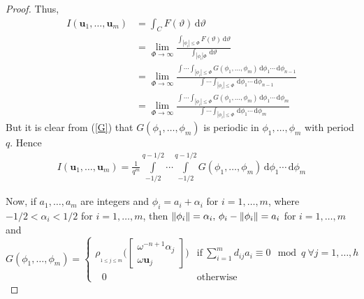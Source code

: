 \documentclass[11pt]{article}
\theoremstyle{definition}
\theoremstyle{proof}
\begin{document}
\begin{proof}
    Thus,
    \begin{align*}
        I(\bm{u}_1, \ldots, \bm{u}_m) &= \int_{C} F(\vartheta ) \, \mathrm{d} \vartheta \\
        &= \lim_{\Phi  \to \infty} \frac{\int_{|\phi _i| \leq \Phi } F(\vartheta ) \, \mathrm{d} \vartheta }{\int_{|\phi _i| \Phi } \, \mathrm{d} \vartheta } \\
        &= \lim_{\Phi  \to \infty} \frac{\int \cdots \int_{|\phi _i| \leq \Phi } G(\phi _1, \ldots, \phi _{m}) \, \mathrm{d} \phi _1 \cdots \, \mathrm{d} \phi _{n-1}}{\int \cdots \int_{|\phi _i| \leq \Phi } \, \mathrm{d} \phi _1 \cdots \, \mathrm{d} \phi _{n-1}} \\
        &= \lim_{\Phi  \to \infty} \frac{\int \cdots \int_{|\phi _i| \leq \Phi } G(\phi _1, \ldots, \phi _{m}) \, \mathrm{d} \phi _1 \cdots \, \mathrm{d} \phi _{m}}{\int \cdots \int_{|\phi _i| \leq \Phi } \, \mathrm{d} \phi _1 \cdots \, \mathrm{d} \phi _{m}}
    \end{align*}
    But it is clear from (\ref{G}) that $G(\phi _1, \ldots, \phi _{m})$ is periodic in $\phi _1, \ldots, \phi _{m}$ with period $q$.
    Hence
    \begin{align}\label{pI}
        I(\bm{u}_1, \ldots, \bm{u}_m) = \frac{1}{q^m} \int\limits_{-1/2}^{q-1/2} \cdots \int\limits_{-1/2}^{q-1/2} G(\phi _1, \ldots, \phi _{m}) \, \mathrm{d} \phi _1 \cdots \, \mathrm{d} \phi _{m}
    \end{align}

    Now, if $a_1, \ldots, a_m$ are integers and $\phi _i = a_i + \alpha _i$ for $i=1, \ldots, m$, where $-1/2 < \alpha _i < 1/2$ for $i = 1, \ldots, m$, then $\norm{\phi _i} = \alpha _i, \, \phi _i - \norm{\phi _i} = a_i$ for $i = 1, \ldots, m$ and
    \[
        G(\phi _1, \ldots, \phi _m) =
        \begin{cases}
            \rho _{_{1\leq j \leq m}} \Bigg(
            \begin{bmatrix}
                \omega ^{-n+1} \alpha _j \\
                \omega \bm{u}_j
            \end{bmatrix}
            \Bigg)   & \text{if} \ \sum\limits_{i=1}^{m} d_{ij}a_i \equiv 0 \mod q \ \forall j = 1, \ldots, h \\
            \ \ \ 0  & \text{otherwise} 
        \end{cases}
    \]


\end{proof}
\end{document}

